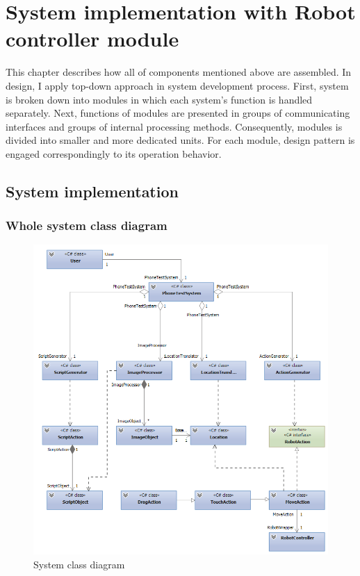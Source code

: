 \chapter{System implementation with Robot controller module}
This chapter describes how all of components mentioned above are assembled. In design, I apply top-down approach in system development process. First, system is broken down into modules in which each system's function is handled separately. Next, functions of modules are presented in groups of communicating interfaces and groups of internal processing methods. Consequently, modules is divided into smaller and more dedicated units. For each module, design pattern is engaged correspondingly to its operation behavior.

\section{System implementation}
\subsection{Whole system class diagram}
    \begin{figure}[H]
		\centering
		\includegraphics[scale=0.75]{Chapters/Fig/class_diagram.png}
		\caption{System class diagram}
		\label{fig:class_diagram}
	\end{figure}

